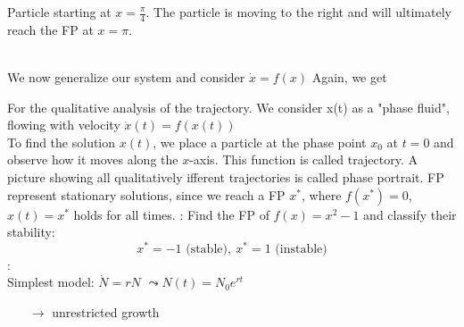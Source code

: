 \noindent Particle starting at $x=\frac{\pi}{4}$. The particle is moving to the right and will ultimately reach the FP at $x=\pi$.
\begin{figure}[H]
\end{figure}
\noindent \textbf{\underline{}}\vspace{0.2 cm}\\
We now generalize our system and consider $\dot{x}=f(x)$
Again, we get
\begin{figure}[H]
\end{figure}
\noindent For the qualitative analysis of the trajectory. We consider x(t) as a "phase fluid", flowing with velocity \underline{\underline{$\dot{x}(t)=f(x(t))$}}\\
To find the solution $x(t)$, we place a particle at the phase point $x_0$ at $t=0$ and observe how it moves along the $x$-axis. This function is called trajectory. A picture showing all qualitatively ifferent trajectories is called phase portrait. FP represent stationary solutions, since we reach a FP $x^\ast$, where $f(x^\ast)=0$, $x(t)=x^\ast$ holds for all times.
\textbf{\underline{}}: Find the FP of $f(x)=x^2-1$ and classify their stability:
\begin{equation*}
	x^\ast=-1 \text{ (stable)},\ x^\ast =1 \text{ (instable)}
\end{equation*}
\textbf{\underline{}}:\vspace{0.2 cm}\\
Simplest model: $\dot{N}=rN$ $\leadsto N(t)=N_0e^{rt}$
\begin{itemize}
	\item[$\to$] unrestricted growth
\end{itemize}
